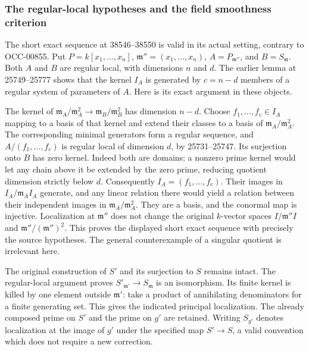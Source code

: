 \subsubsection{The regular-local hypotheses and the field smoothness criterion}\label{algebra-proof-049-the-regular-local-hypotheses-and-the-field-smoothness-criterion}

The short exact sequence at 38546--38550 is valid in its actual setting, contrary to OCC-00855. Put \(P=k[x_1,\ldots,x_n]\), \(\mathfrak m''=(x_1,\ldots,x_n)\), \(A=P_{\mathfrak m''}\), and \(B=S_{\mathfrak m}\). Both \(A\) and \(B\) are regular local, with dimensions \(n\) and \(d\). The earlier lemma at 25749--25777 shows that the kernel \(I_A\) is generated by \(c=n-d\) members of a regular system of parameters of \(A\). Here is its exact argument in these objects.

The kernel of \(\mathfrak m_A/\mathfrak m_A^2\to\mathfrak m_B/\mathfrak m_B^2\) has dimension \(n-d\). Choose \(f_1,\ldots,f_c\in I_A\) mapping to a basis of that kernel and extend their classes to a basis of \(\mathfrak m_A/\mathfrak m_A^2\). The corresponding minimal generators form a regular sequence, and \(A/(f_1,\ldots,f_c)\) is regular local of dimension \(d\), by 25731--25747. Its surjection onto \(B\) has zero kernel. Indeed both are domains; a nonzero prime kernel would let any chain above it be extended by the zero prime, reducing quotient dimension strictly below \(d\). Consequently \(I_A=(f_1,\ldots,f_c)\). Their images in \(I_A/\mathfrak m_A I_A\) generate, and any linear relation there would yield a relation between their independent images in \(\mathfrak m_A/\mathfrak m_A^2\). They are a basis, and the conormal map is injective. Localization at \(\mathfrak m''\) does not change the original \(k\)-vector spaces \(I/\mathfrak m'' I\) and \(\mathfrak m''/(\mathfrak m'')^2\). This proves the displayed short exact sequence with precisely the source hypotheses. The general counterexample of a singular quotient is irrelevant here.

The original construction of \(S'\) and its surjection to \(S\) remains intact. The regular-local argument proves \(S'_{\mathfrak m'}\to S_{\mathfrak m}\) is an isomorphism. Its finite kernel is killed by one element outside \(\mathfrak m'\): take a product of annihilating denominators for a finite generating set. This gives the indicated principal localization. The already composed prime on \(S'\) and the prime on \(g'\) are retained. Writing \(S_{g'}\) denotes localization at the image of \(g'\) under the specified map \(S'\to S\), a valid convention which does not require a new correction.

